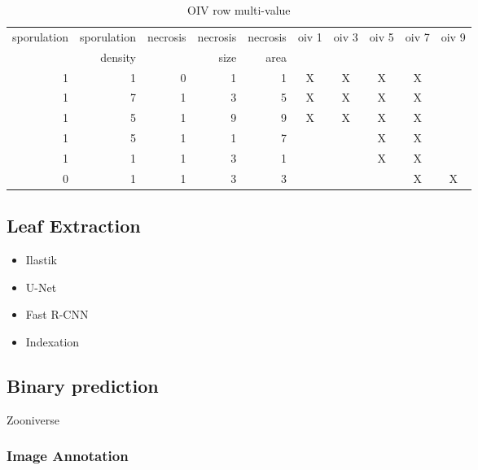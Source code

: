 \documentclass[english]{article}
\begin{document}
\begin{table}[H]
	\centering
	\caption{OIV row multi-value}\label{tab:oivconfusion}
	\begin{tabular}{rrrrrccccc}
		\toprule
		sporulation & sporulation & necrosis & necrosis & necrosis & oiv 1 & oiv 3 & oiv 5 & oiv 7 & oiv 9 \\
		{}          & density     & {}       & size     & area     & {}    & {}    & {}    & {}    & {}    \\
		\midrule
		1           & 1           & 0        & 1        & 1        & X     & X     & X     & X     &       \\
		1           & 7           & 1        & 3        & 5        & X     & X     & X     & X     &       \\
		1           & 5           & 1        & 9        & 9        & X     & X     & X     & X     &       \\
		1           & 5           & 1        & 1        & 7        &       &       & X     & X     &       \\
		1           & 1           & 1        & 3        & 1        &       &       & X     & X     &       \\
		0           & 1           & 1        & 3        & 3        &       &       &       & X     & X     \\
		\bottomrule
	\end{tabular}
\end{table}

\subsection{Leaf Extraction}

\begin{itemize}
	\item Ilastik \parencite{bergIlastikInteractiveMachine2019}
	\item U-Net \parencite{ronnebergerUNetConvolutionalNetworks2015}
	\item Fast R-CNN \parencite{girshickFastRCNN2015}
	\item Indexation
\end{itemize}

\subsection{Binary prediction}
Zooniverse \parencite{zooniverse}

\subsubsection{Image Annotation}
\end{document}
